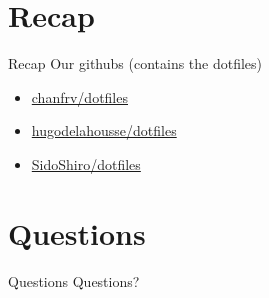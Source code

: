 \documentclass{beamer}
\begin{document}
\section*{Recap}
\begin{frame}{Recap}
Our githubs (contains the dotfiles)
\begin{itemize}
  \item \href{https://github.com/chanfrv/dotfiles}{chanfrv/dotfiles}
  \item \href{https://github.com/hugodelahousse/dotfiles}{hugodelahousse/dotfiles}
  \item \href{https://github.com/SidoShiro/dotfiles}{SidoShiro/dotfiles}
\end{itemize}
\end{frame}

\section*{Questions}
\begin{frame}{Questions}
  Questions?
\end{frame}
\end{document}
